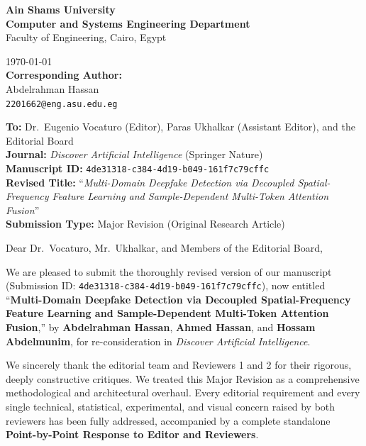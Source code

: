 \documentclass[10pt,a4paper]{article}
\begin{document}
\sloppy

\noindent
\begin{minipage}[t]{0.58\textwidth}
    {\Large\bfseries\color{navy}Ain Shams University}\\[2pt]
    {\small\bfseries Computer and Systems Engineering Department}\\
    {\small Faculty of Engineering, Cairo, Egypt}
\end{minipage}%
\hfill
\begin{minipage}[t]{0.40\textwidth}
    \raggedleft
    {\small\today}\\[2pt]
    {\small\bfseries\color{navy}Corresponding Author:}\\
    {\small Abdelrahman Hassan}\\
    {\small \texttt{2201662@eng.asu.edu.eg}}
\end{minipage}

\vspace{4pt}
\noindent{\color{navy}\rule{\textwidth}{1.2pt}}
\vspace{6pt}

\noindent\textbf{To:} Dr.\ Eugenio Vocaturo (Editor), Paras Ukhalkar (Assistant Editor), and the Editorial Board\\
\textbf{Journal:} \textit{Discover Artificial Intelligence} (Springer Nature)\\
\textbf{Manuscript ID:} \texttt{4de31318-c384-4d19-b049-161f7c79cffc}\\
\textbf{Revised Title:} ``\textit{Multi-Domain Deepfake Detection via Decoupled Spatial-Frequency Feature Learning and Sample-Dependent Multi-Token Attention Fusion}''\\
\textbf{Submission Type:} Major Revision (Original Research Article)

\vspace{4pt}
\noindent Dear Dr.\ Vocaturo, Mr.\ Ukhalkar, and Members of the Editorial Board,

We are pleased to submit the thoroughly revised version of our manuscript (Submission ID: {\small\texttt{4de31318-c384-4d19-b049-161f7c79cffc}}), now entitled ``\textbf{Multi-Domain Deepfake Detection via Decoupled Spatial-Frequency Feature Learning and Sample-Dependent Multi-Token Attention Fusion},'' by \textbf{Abdelrahman Hassan}, \textbf{Ahmed Hassan}, and \textbf{Hossam Abdelmunim}, for re-consideration in \textit{Discover Artificial Intelligence}.

We sincerely thank the editorial team and Reviewers 1 and 2 for their rigorous, deeply constructive critiques. We treated this Major Revision as a comprehensive methodological and architectural overhaul. Every editorial requirement and every single technical, statistical, experimental, and visual concern raised by both reviewers has been fully addressed, accompanied by a complete standalone \textbf{Point-by-Point Response to Editor and Reviewers}.
\end{document}
